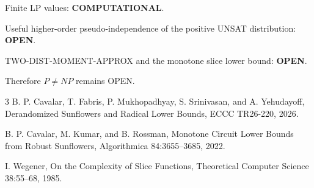 \documentclass[11pt]{article}
\begin{document}
Finite LP values: \textbf{COMPUTATIONAL}.

Useful higher-order pseudo-independence of the positive UNSAT distribution:
\textbf{OPEN}.

TWO-DIST-MOMENT-APPROX and the monotone slice lower bound:
\textbf{OPEN}.

Therefore \(P\ne NP\) remains OPEN.

\begin{thebibliography}{3}
B. P. Cavalar, T. Fabris, P. Mukhopadhyay, S. Srinivasan, and A. Yehudayoff,
Derandomized Sunflowers and Radical Lower Bounds,
ECCC TR26-220, 2026.

B. P. Cavalar, M. Kumar, and B. Rossman,
Monotone Circuit Lower Bounds from Robust Sunflowers,
Algorithmica 84:3655--3685, 2022.

I. Wegener,
On the Complexity of Slice Functions,
Theoretical Computer Science 38:55--68, 1985.
\end{thebibliography}
\end{document}
